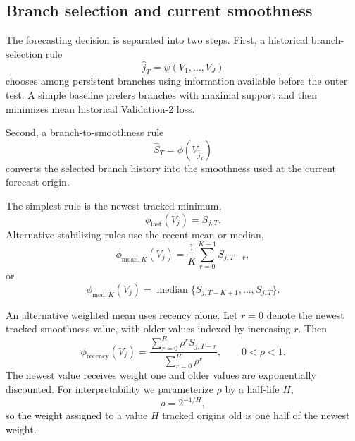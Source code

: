 \subsection{Branch selection and current smoothness}

The forecasting decision is separated into two steps. First, a historical branch-selection rule
\begin{equation}
\label{eq:branch_selector}
\widehat j_T
=
\psi(V_1,\ldots,V_J)
\end{equation}
chooses among persistent branches using information available before the outer test. A simple baseline prefers branches with maximal support and then minimizes mean historical Validation-2 loss.

Second, a branch-to-smoothness rule
\begin{equation}
\label{eq:phi_rule}
\widehat S_T
=
\phi(V_{\widehat j_T})
\end{equation}
converts the selected branch history into the smoothness used at the current forecast origin.

The simplest rule is the newest tracked minimum,
\begin{equation}
\label{eq:rule_latest}
\phi_{\mathrm{last}}(V_j)=S_{j,T}.
\end{equation}
Alternative stabilizing rules use the recent mean or median,
\begin{equation}
\label{eq:rule_recent_mean}
\phi_{\mathrm{mean},K}(V_j)
=
\frac1K
\sum_{r=0}^{K-1}
S_{j,T-r},
\end{equation}
or
\begin{equation}
\label{eq:rule_recent_median}
\phi_{\mathrm{med},K}(V_j)
=
\operatorname{median}
\{S_{j,T-K+1},\ldots,S_{j,T}\}.
\end{equation}

An alternative weighted mean uses recency alone. Let $r=0$ denote the newest tracked smoothness value, with older values indexed by increasing $r$. Then
\begin{equation}
\label{eq:rule_recency}
\phi_{\mathrm{recency}}(V_j)
=
\frac{
\sum_{r=0}^{R}\rho^r S_{j,T-r}
}{
\sum_{r=0}^{R}\rho^r
},
\qquad
0<\rho<1.
\end{equation}
The newest value receives weight one and older values are exponentially discounted. For interpretability we parameterize $\rho$ by a half-life $H$,
\begin{equation}
\label{eq:recency_half_life}
\rho=2^{-1/H},
\end{equation}
so the weight assigned to a value $H$ tracked origins old is one half of the newest weight.


